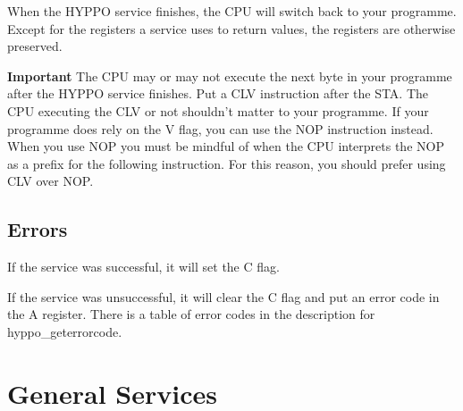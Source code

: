 When the HYPPO service finishes, the CPU will switch back to your programme.
Except for the registers a service uses to return values, the registers are
otherwise preserved.

\textbf{Important} The CPU may or may not execute the next byte in your
programme after the HYPPO service finishes. Put a CLV instruction after the STA.
The CPU executing the CLV or not shouldn't matter to your programme. If your
programme does rely on the V flag, you can use the NOP instruction instead. When
you use NOP you must be mindful of when the CPU interprets the NOP as a prefix
for the following instruction. For this reason, you should prefer using CLV
over NOP.

\subsection{Errors}

If the service was successful, it will set the C flag.

If the service was unsuccessful, it will clear the C flag and put an error code
in the A register. There is a table of error codes in the description for
hyppo\_geterrorcode.



\newpage
\section{General Services}


